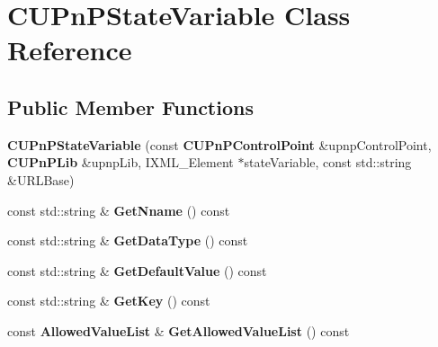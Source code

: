 \section{CUPnPStateVariable Class Reference}
\label{classCUPnPStateVariable}
\subsection*{Public Member Functions}
\begin{DoxyCompactItemize}
\item 
{\bfseries CUPnPStateVariable} (const {\bf CUPnPControlPoint} \&upnpControlPoint, {\bf CUPnPLib} \&upnpLib, IXML\_\-Element $\ast$stateVariable, const std::string \&URLBase)\label{classCUPnPStateVariable_a343221cfe6f8faf377f46e926274718c}

\item 
const std::string \& {\bfseries GetNname} () const \label{classCUPnPStateVariable_ac396ff86f332bfde30a420ff3269db53}

\item 
const std::string \& {\bfseries GetDataType} () const \label{classCUPnPStateVariable_a5fed80b1509e0bf1e1635317a2db31b8}

\item 
const std::string \& {\bfseries GetDefaultValue} () const \label{classCUPnPStateVariable_a758c7822ce4800c853134c8a9bfe7cb3}

\item 
const std::string \& {\bfseries GetKey} () const \label{classCUPnPStateVariable_a789fde81d959182bc0afb1aeea3816d9}

\item 
const {\bf AllowedValueList} \& {\bfseries GetAllowedValueList} () const \label{classCUPnPStateVariable_a7451899e2229b3a33436c2af22bbad81}

\end{DoxyCompactItemize}
